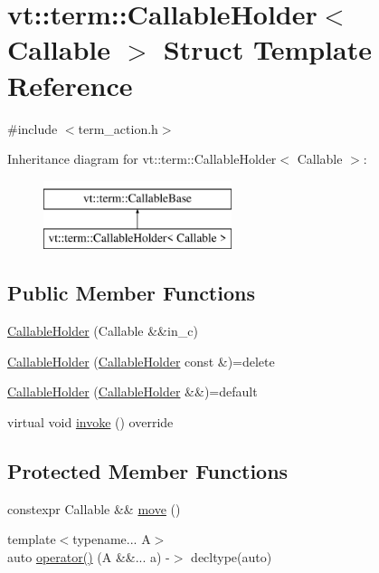 \hypertarget{structvt_1_1term_1_1_callable_holder}{}\section{vt\+:\+:term\+:\+:Callable\+Holder$<$ Callable $>$ Struct Template Reference}
\label{structvt_1_1term_1_1_callable_holder}


{\ttfamily \#include $<$term\+\_\+action.\+h$>$}

Inheritance diagram for vt\+:\+:term\+:\+:Callable\+Holder$<$ Callable $>$\+:\begin{figure}[H]
\begin{center}
\leavevmode
\includegraphics[height=2.000000cm]{structvt_1_1term_1_1_callable_holder}
\end{center}
\end{figure}
\subsection*{Public Member Functions}
\begin{DoxyCompactItemize}
\item 
\hyperlink{structvt_1_1term_1_1_callable_holder_a69d93533fc725eb0206a34e98395b7f3}{Callable\+Holder} (Callable \&\&in\+\_\+c)
\item 
\hyperlink{structvt_1_1term_1_1_callable_holder_a61c0e9929ff96936132fe697d6585992}{Callable\+Holder} (\hyperlink{structvt_1_1term_1_1_callable_holder}{Callable\+Holder} const \&)=delete
\item 
\hyperlink{structvt_1_1term_1_1_callable_holder_a02091f8787e03f8e29a9e78a975b86d4}{Callable\+Holder} (\hyperlink{structvt_1_1term_1_1_callable_holder}{Callable\+Holder} \&\&)=default
\item 
virtual void \hyperlink{structvt_1_1term_1_1_callable_holder_a33bc8b5d543eb4338c257522cc0084f1}{invoke} () override
\end{DoxyCompactItemize}
\subsection*{Protected Member Functions}
\begin{DoxyCompactItemize}
\item 
constexpr Callable \&\& \hyperlink{structvt_1_1term_1_1_callable_holder_a9a1517406276e39c5a5c140196ea7ccf}{move} ()
\item 
{\footnotesize template$<$typename... A$>$ }\\auto \hyperlink{structvt_1_1term_1_1_callable_holder_a4cf06b82cc1a80a9070f77de9841957f}{operator()} (A \&\&... a) -\/$>$ decltype(auto)
\end{DoxyCompactItemize}


